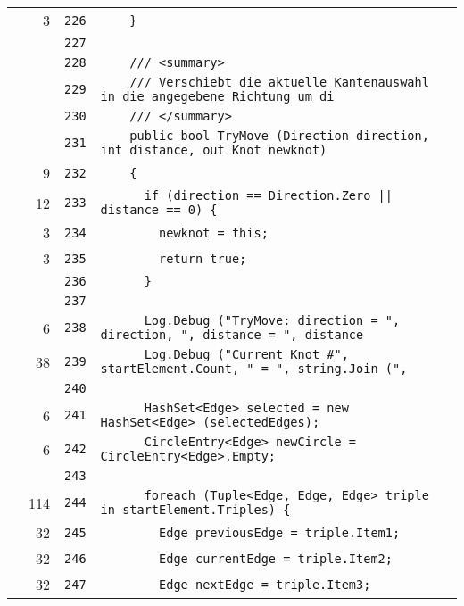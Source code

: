 \documentclass[a4paper,10pt]{article}
\begin{document}
\begin{longtable}[l]{lrrl}
\cellcolor{green} & 3 & \verb~226~ & \verb~    }~\\
\cellcolor{gray} &  & \verb~227~ & \verb~~\\
\cellcolor{gray} &  & \verb~228~ & \verb~    /// <summary>~\\
\cellcolor{gray} &  & \verb~229~ & \verb~    /// Verschiebt die aktuelle Kantenauswahl in die angegebene Richtung um di~\\
\cellcolor{gray} &  & \verb~230~ & \verb~    /// </summary>~\\
\cellcolor{gray} &  & \verb~231~ & \verb~    public bool TryMove (Direction direction, int distance, out Knot newknot)~\\
\cellcolor{green} & 9 & \verb~232~ & \verb~    {~\\
\cellcolor{green} & 12 & \verb~233~ & \verb~      if (direction == Direction.Zero || distance == 0) {~\\
\cellcolor{green} & 3 & \verb~234~ & \verb~        newknot = this;~\\
\cellcolor{green} & 3 & \verb~235~ & \verb~        return true;~\\
\cellcolor{gray} &  & \verb~236~ & \verb~      }~\\
\cellcolor{gray} &  & \verb~237~ & \verb~~\\
\cellcolor{green} & 6 & \verb~238~ & \verb~      Log.Debug ("TryMove: direction = ", direction, ", distance = ", distance~\\
\cellcolor{green} & 38 & \verb~239~ & \verb~      Log.Debug ("Current Knot #", startElement.Count, " = ", string.Join (", ~\\
\cellcolor{gray} &  & \verb~240~ & \verb~~\\
\cellcolor{green} & 6 & \verb~241~ & \verb~      HashSet<Edge> selected = new HashSet<Edge> (selectedEdges);~\\
\cellcolor{green} & 6 & \verb~242~ & \verb~      CircleEntry<Edge> newCircle = CircleEntry<Edge>.Empty;~\\
\cellcolor{gray} &  & \verb~243~ & \verb~~\\
\cellcolor{green} & 114 & \verb~244~ & \verb~      foreach (Tuple<Edge, Edge, Edge> triple in startElement.Triples) {~\\
\cellcolor{green} & 32 & \verb~245~ & \verb~        Edge previousEdge = triple.Item1;~\\
\cellcolor{green} & 32 & \verb~246~ & \verb~        Edge currentEdge = triple.Item2;~\\
\cellcolor{green} & 32 & \verb~247~ & \verb~        Edge nextEdge = triple.Item3;~\\

\end{longtable}
\end{document}
